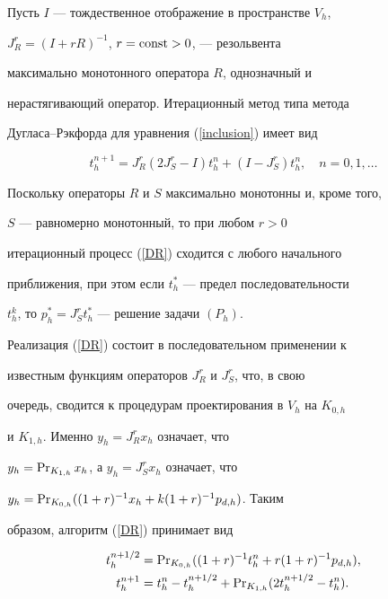 Пусть $I$ --- тождественное отображение в пространстве $V_h$,


$J^r_{R}=(I+r R)^{-1}$, $r=\operatorname{const}>0$, --- резольвента


максимально монотонного оператора $R$, однозначный и


нерастягивающий оператор. Итерационный метод типа метода


Дугласа--Рэкфорда для уравнения (\ref{inclusion}) имеет вид


\begin{equation}\label{DR}


t_h^{n+1}=J^r_{R}(2J^r_{S}-I)t_h^n +


(I-J^r_{S})t_h^n,\quad n=0,1,\dotsc


\end{equation}


Поскольку операторы $R$ и $S$ максимально монотонны и, кроме того,


$S$ --- равномерно монотонный, то при любом $r>0$


итерационный процесс (\ref{DR}) сходится с любого начального


приближения, при этом если $t_h^*$ --- предел последовательности


$t_h^k$, то $p_h^*=J^r_{S}t_h^*$ --- решение задачи $(P_h)$.





Реализация (\ref{DR}) состоит в последовательном применении к


известным функциям операторов $J^r_{R}$ и $J^r_{S}$, что, в свою


очередь, сводится к процедурам проектирования в $V_h$ на $K_{0,h}$


и $K_{1,h}$. Именно $y_h=J^r_{R}x_h$ означает, что


$y_h=\operatorname{Pr}_{K_{1,h}}x_h$, а $y_h=J^r_{S}x_h$ означает, что


$y_h=\PR_{K_{0,h}}((1+r)^{-1}x_h+\linebreak k(1+r)^{-1}p_{d,h})$. Таким


образом, алгоритм (\ref{DR}) принимает вид


\begin{align*}


t_h^{n+1/2}&=


\PR_{K_{0,h}}((1+r)^{-1} t_h^n+r(1+r)^{-1}p_{d,h}),\\


t_h^{n+1}&=t_h^n-t_h^{n+1/2}+\PR_{K_{1,h}} (2 t_h^{n+1/2} - t_h^n).


\end{align*}


